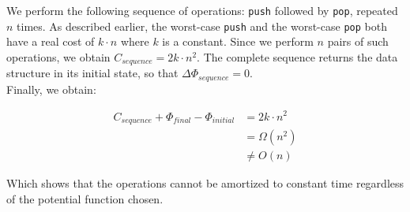 We perform the following sequence of operations: \texttt{push} followed by \texttt{pop}, repeated $n$ times. As described earlier, the worst-case \texttt{push} and the worst-case \texttt{pop} both have a real cost of $k \cdot n$ where $k$ is a constant. Since we perform $n$ pairs of such operations, we obtain $C_{sequence} = 2k \cdot n^2$. The complete sequence returns the data structure in its initial state, so that $\Delta\Phi_{sequence} = 0$.\\

Finally, we obtain:

\[
\begin{array}{rl}
  C_{sequence} + \Phi_{final} - \Phi_{initial} & = 2k \cdot n^2 \\
   & = \Omega (n^2) \\
   & \neq O(n)
\end{array}
\]

Which shows that the operations cannot be amortized to constant time regardless of the potential function chosen.
